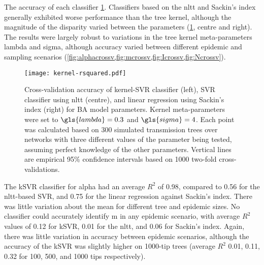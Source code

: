 The accuracy of each classifier 
 \cref{fig:rsquared}.
Classifiers based on  the \gls{nltt} and
Sackin's index generally exhibited worse performance than the tree kernel,
although the magnitude of the disparity varied between the parameters
(\cref{fig:rsquared}, centre and right). The results were largely robust to
variations in the tree kernel meta-parameters \gls{lambda} and \gls{sigma},
although accuracy varied between different epidemic and sampling scenarios
(\cref{fig:alphacrossv,fig:mcrossv,fig:Icrossv,fig:Ncrossv}). 

\begin{figure}[ht]
    \centering
    \texttt{[image: kernel-rsquared.pdf]}
    \caption[
        Cross-validation accuracy of kernel-SVR, nLTT-based SVR, and Sackin's
        index regression classifiers for BA model parameters.
    ]{
        Cross-validation accuracy of kernel-SVR classifier (left), SVR
        classifier using \gls{nltt} (centre), and linear regression using
        Sackin's index (right) for \gls{BA} model parameters. Kernel
        meta-parameters were set to $\gls{lambda} = 0.3$ and $\gls{sigma} = 4$.
        Each point was calculated based on 300 simulated transmission trees
        over networks with three different values of the parameter being
        tested, assuming perfect knowledge of the other parameters. Vertical
        lines are empirical 95\% confidence intervals based on 1000 two-fold
        cross-validations. 
    }
    \label{fig:rsquared}
\end{figure}

The \gls{kSVR} classifier for \gls{alpha} had an average $R^2$ of 
    0.98,
compared to 
    0.56
for the \gls{nltt}-based SVR, and
    0.75
for the linear regression against Sackin's index. There was little variation
about the mean for different tree and epidemic sizes. No classifier could
accurately identify \gls{m} in any epidemic scenario, with average $R^2$ values
of 
  0.12 for \gls{kSVR},
  0.01 for the \gls{nltt}, and
  0.06
for Sackin's index. Again, there was little variation in accuracy between
epidemic scenarios, although the accuracy of the \gls{kSVR} was slightly higher
on 1000-tip trees 
    (average $R^2$ 
     0.01,
     0.11,
     0.32
     for 100, 500, and 1000 tips respectively).

